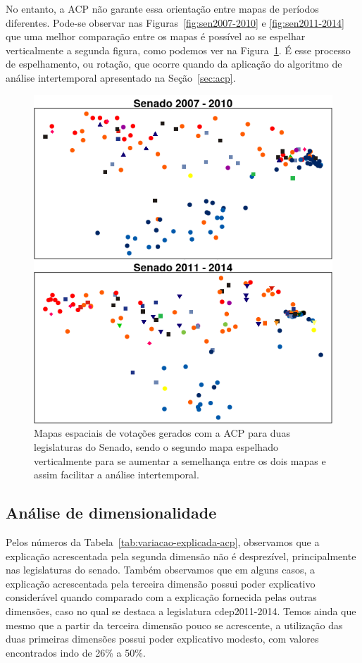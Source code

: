 \documentclass[
	article,			%
	12pt,				%
	oneside,			%
	a4paper,			%
	english,			%
	brazil,				%
	sumario=tradicional,
	oldfontcommands %
	]{abntex2}
\begin{document}
No entanto, a ACP não garante essa orientação entre mapas de períodos diferentes. Pode-se observar nas Figuras~\ref{fig:sen2007-2010} e \ref{fig:sen2011-2014} que uma melhor comparação entre os mapas é possível ao se espelhar verticalmente a segunda figura, como podemos ver na Figura~\ref{fig:sen-rotacao}. É esse processo de espelhamento, ou rotação, que ocorre quando da aplicação do algoritmo de análise intertemporal apresentado na Seção~\ref{sec:acp}.

\begin{figure}[h!]
  \centering
  \includegraphics[scale=0.7]{figs/sen-rotacao.png}
  \caption{Mapas espaciais de votações gerados com a ACP para duas legislaturas do Senado, sendo o segundo mapa espelhado verticalmente para se aumentar a semelhança entre os dois mapas e assim facilitar a análise intertemporal.}
  \label{fig:sen-rotacao}
\end{figure}

\subsection{Análise de dimensionalidade}

Pelos números da Tabela~\ref{tab:variacao-explicada-acp}, observamos que a explicação acrescentada pela segunda dimensão não é desprezível, principalmente nas legislaturas do senado. Também observamos que em alguns casos, a explicação acrescentada pela terceira dimensão possui poder explicativo considerável quando comparado com a explicação fornecida pelas outras dimensões, caso no qual se destaca a legislatura cdep2011-2014. Temos ainda que mesmo que a partir da terceira dimensão pouco se acrescente, a utilização das duas primeiras dimensões possui poder explicativo modesto, com valores encontrados indo de 26\% a 50\%. 
\end{document}
